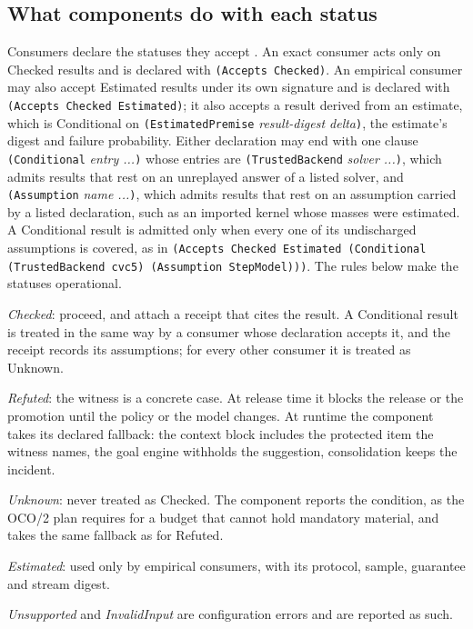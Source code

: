 \documentclass[11pt]{article}
\newcommand{\code}[1]{\texttt{#1}}
\theoremstyle{definition}
\theoremstyle{plain}
\begin{document}
\subsection{What components do with each status}\label{sec:statuses}

Consumers declare the statuses they accept \cite[Section~2.7]{spec}. An exact consumer acts only
on Checked results and is declared with \code{(Accepts Checked)}. An empirical consumer may also
accept Estimated results under its own signature and is declared with
\code{(Accepts Checked Estimated)}; it also accepts a result derived from an estimate, which is
Conditional on \code{(EstimatedPremise} \emph{result-digest delta}\code{)}, the estimate's digest and
failure probability. Either declaration may end with one clause \code{(Conditional} \emph{entry
...}\code{)} whose entries are \code{(TrustedBackend} \emph{solver ...}\code{)}, which admits results
that rest on an unreplayed answer of a listed solver, and \code{(Assumption} \emph{name
...}\code{)}, which admits results that rest on an assumption carried by a listed declaration, such
as an imported kernel whose masses were estimated. A Conditional result is admitted only when every
one of its undischarged assumptions is covered, as in
\code{(Accepts Checked Estimated (Conditional (TrustedBackend cvc5) (Assumption StepModel)))}. The
rules below make the statuses operational.

\emph{Checked}: proceed, and attach a receipt that cites the result. A Conditional result is
treated in the same way by a consumer whose declaration accepts it, and the receipt records its
assumptions; for every other consumer it is treated as Unknown.

\emph{Refuted}: the witness is a concrete case. At release time it blocks the release or the
promotion until the policy or the model changes. At runtime the component takes its declared
fallback: the context block includes the protected item the witness names, the goal engine
withholds the suggestion, consolidation keeps the incident.

\emph{Unknown}: never treated as Checked. The component reports the condition, as the OCO/2 plan
requires for a budget that cannot hold mandatory material, and takes the same fallback as for
Refuted.

\emph{Estimated}: used only by empirical consumers, with its protocol, sample, guarantee and stream
digest.

\emph{Unsupported} and \emph{InvalidInput} are configuration errors and are reported as such.
\end{document}
